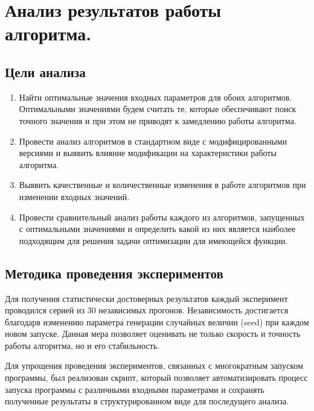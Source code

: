 \documentclass[12pt,a4paper]{article}
\begin{document}
\section{Анализ результатов работы алгоритма.}
\label{sec:analysis}

\subsection{Цели анализа}
\begin{enumerate}
    \item Найти оптимальные значения входных параметров для обоих алгоритмов. Оптимальными значениями будем считать те, которые обеспечивают поиск точного значения и при этом не приводят к замедлению работы алгоритма.
    \item Провести анализ алгоритмов в стандартном виде с модифицированными версиями и выявить влияние модификации на характеристики работы алгоритма.
    \item Выявить качественные и количественные изменения в работе алгоритмов при изменении входных значений.
    \item Провести сравнительный анализ работы каждого из алгоритмов, запущенных с оптимальными значениями и определить какой из них является наиболее подходящим для решения задачи оптимизации для имеющейся функции.
\end{enumerate}

\subsection{Методика проведения экспериментов}
Для получения статистически достоверных результатов каждый эксперимент проводился серией из 30 независимых прогонов.
Независимость достигается благодаря изменению параметра генерации случайных величин (seed) при каждом новом запуске.
Данная мера позволяет оценивать не только скорость и точность работы алгоритма, но и его стабильность.

Для упрощения проведения экспериментов, связанных с многократным запуском программы, был реализован скрипт, который
позволяет автоматизировать процесс запуска программы с различными входными параметрами и сохранять полученные
результаты в структурированном виде для последущего анализа.
\end{document}
